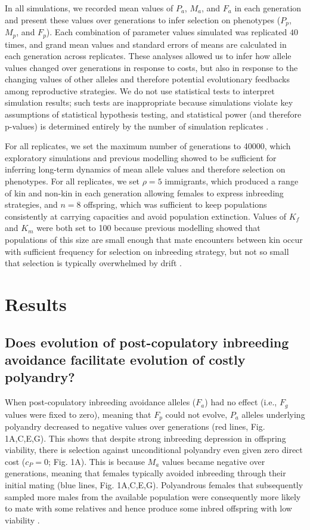 \documentclass[12pt]{article}
\begin{document}
In all simulations, we recorded mean values of $P_{a}$, $M_{a}$, and $F_{a}$ in each generation and present these values over generations to infer selection on phenotypes ($P_{p}$, $M_{p}$, and $F_{p}$). Each combination of parameter values simulated was replicated $40$ times, and grand mean values and standard errors of means are calculated in each generation across replicates. These analyses allowed us to infer how allele values changed over generations in response to costs, but also in response to the changing values of other alleles and therefore potential evolutionary feedbacks among reproductive strategies. We do not use statistical tests to interpret simulation results; such tests are inappropriate because simulations violate key assumptions of statistical hypothesis testing, and statistical power (and therefore p-values) is determined entirely by the number of simulation replicates \cite[][]{White2014}. 

For all replicates, we set the maximum number of generations to 40000, which exploratory simulations and previous modelling \cite[][]{Duthie} showed to be sufficient for inferring long-term dynamics of mean allele values and therefore selection on phenotypes. For all replicates, we set $\rho=5$ immigrants, which produced a range of kin and non-kin in each generation allowing females to express inbreeding strategies, and $n=8$ offspring, which was sufficient to keep populations consistently at carrying capacities and avoid population extinction. Values of $K_{f}$ and $K_{m}$ were both set to 100 because previous modelling showed that populations of this size are small enough that mate encounters between kin occur with sufficient frequency for selection on inbreeding strategy, but not so small that selection is typically overwhelmed by drift \cite[][]{Duthie2016a}.

\section*{Results}

\subsection*{Does evolution of post-copulatory inbreeding avoidance facilitate evolution of costly polyandry?}

When post-copulatory inbreeding avoidance alleles ($F_{a}$) had no effect (i.e., $F_{g}$ values were fixed to zero), meaning that $F_{p}$ could not evolve, $P_{a}$ alleles underlying polyandry decreased to negative values over generations (red lines, Fig. 1A,C,E,G). This shows that despite strong inbreeding depression in offspring viability, there is selection against unconditional polyandry even given zero direct cost ($c_{P}=0$; Fig. 1A). This is because $M_{a}$ values became negative over generations, meaning that females typically avoided inbreeding through their initial mating (blue lines, Fig. 1A,C,E,G). Polyandrous females that subsequently sampled more males from the available population were consequently more likely to mate with some relatives and hence produce some inbred offspring with low viability \cite[see also][]{Duthie}. 
\end{document}
